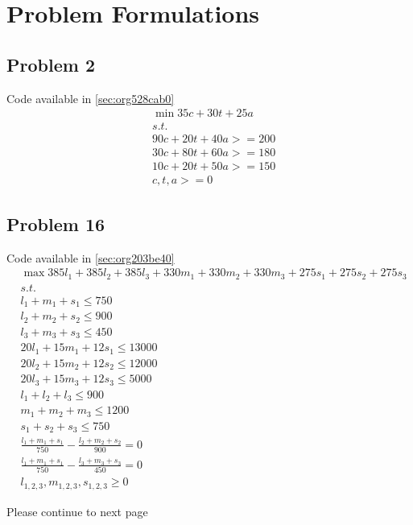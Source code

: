 \documentclass[11pt]{article}
\begin{document}
\section{Problem Formulations}
\label{sec:org17a41fc}
\subsection{Problem 2}
\label{sec:org9d5c16c}
Code available in \ref{sec:org528cab0}
\begin{align*}
&\min 35c + 30t + 25a\\
&s.t.\\
&90c + 20t + 40a >= 200\\
&30c + 80t + 60a >= 180\\
&10c + 20t + 50a >= 150\\
&c,t,a >= 0
\end{align*}
\subsection{Problem 16}
\label{sec:org418163d}
Code available in \ref{sec:org203be40}
\begin{align*}
& \max 385l_1 + 385l_2 + 385l_3 + 330m_1 +  330m_2 + 330m_3 + 275s_1+275s_2+275s_3\\
& s.t.\\
& l_1 + m_1 + s_1 \leq 750\\
& l_2 + m_2 + s_2 \leq 900\\
& l_3 + m_3 + s_3 \leq 450\\
& 20l_1 + 15m_1 + 12s_1 \leq 13000\\
& 20l_2 + 15m_2 + 12s_2 \leq 12000\\
& 20l_3 + 15m_3 + 12s_3 \leq 5000\\
& l_1 + l_2 + l_3 \leq 900\\
& m_1 + m_2 + m_3 \leq 1200\\
& s_1 + s_2 + s_3 \leq 750\\
& \frac{l_1 + m_1 + s_1}{750}- \frac{l_2 + m_2 + s_2}{900}= 0\\
& \frac{l_1 + m_1 + s_1}{750}- \frac{l_3 + m_3 + s_3}{450}= 0\\
& l_{1,2,3},m_{1,2,3},s_{1,2,3} \geq 0
\end{align*}

\vfill
Please continue to next page
\newpage
\end{document}
